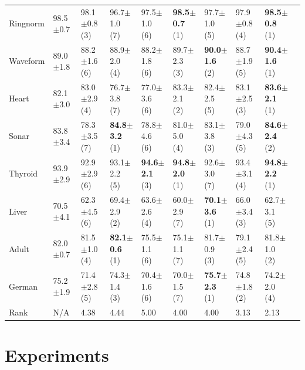 \begin{table}[!thb]
\begin{center}
{\begin{tabular}{l|l|llllllll}
{Ringnorm}  &98.5$\pm$0.7   &98.1$\pm$0.8 (3)    &96.7$\pm$1.0 (7)   &97.5$\pm$1.0 (6)   &{\bf98.5$\pm$0.7} (1)   &97.7$\pm$1.0 (5) &97.9$\pm$0.8 (4)     &{\bf98.5$\pm$0.8} (1)\\
{Waveform} &89.0$\pm$1.8   &88.2$\pm$1.6 (6)    &88.9$\pm$2.0 (4)   &88.2$\pm$1.8 (6)   &89.7$\pm$2.3 (3)   &{\bf90.0$\pm$1.6} (2)  &88.7$\pm$1.9 (5)     &{\bf90.4$\pm$1.6} (1)\\
Heart           &82.1$\pm$3.0   &83.0$\pm$2.9 (4)   &76.7$\pm$3.8 (7)   &77.0$\pm$3.6 (6)   &83.3$\pm$2.1 (2)   &82.4$\pm$2.5 (5)  &83.1$\pm$2.5 (3)    &{\bf83.6$\pm$2.1} (1)\\
Sonar           &83.8$\pm$3.4   &78.3$\pm$3.5 (7)   &{\bf84.8$\pm$3.2} (1)   &78.8$\pm$4.6 (6)   &81.0$\pm$5.0 (4)   &83.1$\pm$3.8 (3)      &79.0$\pm$4.3 (5)    &{\bf84.6$\pm$2.4} (2)\\
Thyroid       &93.9$\pm$2.9   &92.9$\pm$2.9 (6)    &93.1$\pm$2.2 (5)   &{\bf94.6$\pm$2.1} (3)   &{\bf94.8$\pm$2.0} (1)   &92.6$\pm$3.0 (7)     &93.4$\pm$3.1 (4)     &{\bf94.8$\pm$2.2} (1)\\
Liver           &70.5$\pm$4.1   &62.3$\pm$4.5 (6)    &69.4$\pm$2.9 (2)   &63.6$\pm$2.6 (4)   &60.0$\pm$2.9 (7)   &{\bf70.1$\pm$3.6} (1)     &66.0$\pm$3.4 (3)    &62.7$\pm$3.1 (5)\\
Adult           &82.0$\pm$0.7   &81.5$\pm$1.0 (4)    &{\bf82.1$\pm$0.6} (1)   &75.5$\pm$1.1 (6)   &75.1$\pm$1.1 (7)   &81.7$\pm$0.9 (3)     &79.1$\pm$2.4 (5)    &81.8$\pm$1.0 (2)\\
German          &75.2$\pm$1.9   &71.4$\pm$2.8 (5)    &74.3$\pm$1.4 (3)   &70.4$\pm$1.6 (6)   &70.0$\pm$1.5 (7)   &{\bf75.7$\pm$2.3} (1)    &74.8$\pm$1.8 (2)   &74.2$\pm$2.0 (4)\\
\hline
\hline
Rank            &N/A    &4.38   &4.44   &5.00   &4.00   &4.00   &3.13   &2.13\\
\hline
\end{tabular}
}
\end{center}
\end{table}

\section{Experiments}
